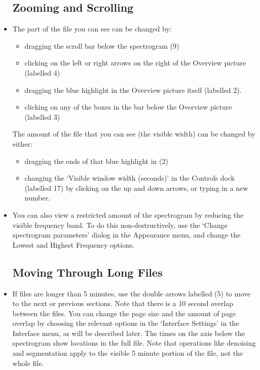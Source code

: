\documentclass{article}
\begin{document}
\begin{itemize}
\subsection{Zooming and Scrolling}

\item The part of the file you can see can be changed by:
	\begin{itemize}
	\item dragging the scroll bar below the spectrogram (9)
	\item clicking on the left or right arrows on the right of the Overview picture (labelled 4)
	\item dragging the blue highlight in the Overview picture itself (labelled 2). 
	\item clicking on any of the boxes in the bar below the Overview picture (labelled 3)
	\end{itemize}
	The amount of the file that you can see (the visible width) can be changed by either: 
	\begin{itemize}
	\item dragging the ends of that blue highlight in (2)
	\item changing the `Visible window width (seconds)' in the Controls dock (labelled 17) by clicking on the up and down arrows, or typing in a new number.
	\end{itemize}

\item You can also view a restricted amount of the spectrogram by reducing the visible frequency band. To do this non-destructively, use the `Change spectrogram parameters' dialog in the Appearance menu, and change the Lowest and Highest Frequency options.

\subsection{Moving Through Long Files}

\item If files are longer than 5 minutes, use the double arrows labelled (5) to move to the next or previous sections. Note that there is a 10 second overlap between the files. You can change the page size and the amount of page overlap by choosing the relevant options in the `Interface Settings' in the Interface menu, as will be described later. The times on the axis below the spectrogram show locations in the full file. Note that operations like denoising and segmentation apply to the visible 5 minute portion of the file, not the whole file. 


\end{itemize}
\end{document}

